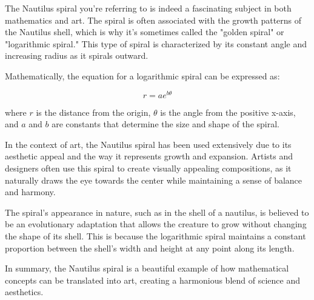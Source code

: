 The Nautilus spiral you're referring to is indeed a fascinating subject in both mathematics and art. The spiral is often associated with the growth patterns of the Nautilus shell, which is why it's sometimes called the "golden spiral" or "logarithmic spiral." This type of spiral is characterized by its constant angle and increasing radius as it spirals outward.

Mathematically, the equation for a logarithmic spiral can be expressed as:

\[ r = ae^{b\theta} \]

where \( r \) is the distance from the origin, \( \theta \) is the angle from the positive x-axis, and \( a \) and \( b \) are constants that determine the size and shape of the spiral.

In the context of art, the Nautilus spiral has been used extensively due to its aesthetic appeal and the way it represents growth and expansion. Artists and designers often use this spiral to create visually appealing compositions, as it naturally draws the eye towards the center while maintaining a sense of balance and harmony.

The spiral's appearance in nature, such as in the shell of a nautilus, is believed to be an evolutionary adaptation that allows the creature to grow without changing the shape of its shell. This is because the logarithmic spiral maintains a constant proportion between the shell's width and height at any point along its length.

In summary, the Nautilus spiral is a beautiful example of how mathematical concepts can be translated into art, creating a harmonious blend of science and aesthetics.